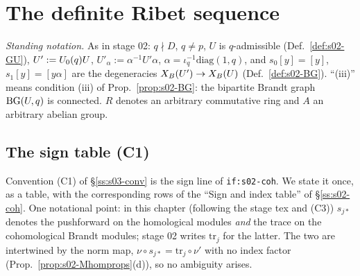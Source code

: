 \section{The definite Ribet sequence}\label{ss:s03-ribet}

\emph{Standing notation.} As in stage 02: $q\nmid D$, $q\ne p$, $U$ is $q$-admissible (Def.~\ref{def:s02-GU}),
$U':=U_0(q)U$, $U'_\alpha:=\alpha^{-1}U'\alpha$, $\alpha=\iota_q^{-1}\mathrm{diag}(1,q)$, and $s_0[y]=[y]$, $s_1[y]=[y\alpha]$ are the
degeneracies $X_B(U')\to X_B(U)$ (Def.~\ref{def:s02-BG}). ``(iii)'' means condition (iii) of Prop.~\ref{prop:s02-BG}: the bipartite Brandt graph
$\mathrm{BG}(U,q)$ is connected. $R$ denotes an arbitrary commutative ring and $A$ an arbitrary abelian group.

\subsection*{The sign table (C1)}
Convention (C1) of \S\ref{ss:s03-conv} is the sign line of \texttt{if:s02-coh}. We state it once, as a table, with the corresponding rows of the
``Sign and index table'' of \S\ref{ss:s02-coh}. One notational point: in this chapter (following the stage tex and (C3)) $s_{j*}$ denotes the
pushforward on the homological modules \emph{and} the trace on the cohomological Brandt modules; stage 02 writes $\mathrm{tr}_j$ for the
latter. The two are intertwined by the norm map, $\nu\circ s_{j*}=\mathrm{tr}_j\circ\nu'$ with no index factor
(Prop.~\ref{prop:s02-Mhomprops}(d)), so no ambiguity arises.

